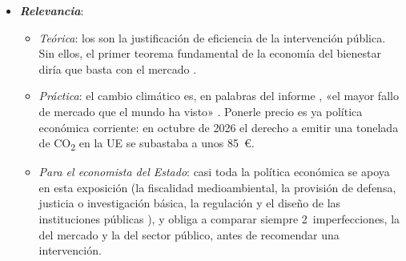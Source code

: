 \documentclass[11pt]{article}
\begin{document}
\begin{itemize}
\item \textbf{\emph{Relevancia}}:
  \begin{itemize}
  \item \emph{Teórica}: los  son la justificación de eficiencia de la intervención pública. Sin ellos, el primer teorema fundamental de la economía del bienestar diría que basta con el mercado .
  \item \emph{Práctica}: el cambio climático es, en palabras del informe , «el mayor fallo de mercado que el mundo ha visto»\nocite{Stern2007Economics} . Ponerle precio es ya política económica corriente: en octubre de 2026 el derecho a emitir una tonelada de CO\textsubscript{2} en la UE se subastaba a unos 85~€\nocite{EEX2026Subastas}.
  \item \emph{Para el economista del Estado}: casi toda la política económica se apoya en esta exposición (la fiscalidad medioambiental, la provisión de defensa, justicia o investigación básica, la regulación  y el diseño de las instituciones públicas ), y obliga a comparar siempre 2~imperfecciones, la del mercado y la del sector público, antes de recomendar una intervención.
  \end{itemize}


\end{itemize}
\end{document}
